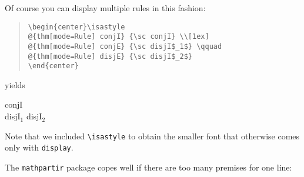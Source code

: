 \begin{isabellebody}
\begin{isamarkuptext}
Of course you can display multiple rules in this fashion:
\begin{quote}
\verb!\begin{center}\isastyle!\\
\verb!@!\verb!{thm[mode=Rule] conjI} {\sc conjI} \\[1ex]!\\
\verb!@!\verb!{thm[mode=Rule] conjE} {\sc disjI$_1$} \qquad!\\
\verb!@!\verb!{thm[mode=Rule] disjE} {\sc disjI$_2$}!\\
\verb!\end{center}!
\end{quote}
yields
\begin{center}\isastyle
{} {\sc conjI} \\[1ex]
 {\sc disjI$_1$} \qquad
{} {\sc disjI$_2$}
\end{center}
Note that we included \verb!\isastyle! to obtain
the smaller font that otherwise comes only with \texttt{display}.

The \texttt{mathpartir} package copes well if there are too many
premises for one line:
\begin{center}
\end{center}


\end{isamarkuptext}
\end{isabellebody}
